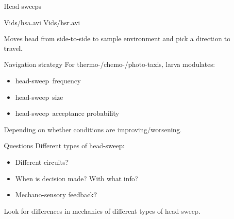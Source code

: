 \documentclass{beamer}%
\newcommand{\hs}{head-sweep}
\newcommand{\Hs}{Head-sweep}
\begin{document}
\begin{frame}{\Hs s}
%
 \begin{center}
 {Vids/hsa.avi}
 {Vids/hsr.avi}
 \end{center}
 Moves head from side-to-side to sample environment and pick a direction to travel.
%
\end{frame}


\begin{frame}{Navigation strategy}
%
 For thermo-/chemo-/photo-taxis, larva modulates:
 \begin{itemize}
   \item \hs\ frequency 
   \item \hs\ size  
   \item \hs\ acceptance probability 
 \end{itemize}
 Depending on whether conditions are improving/worsening.

%
\end{frame}


\begin{frame}{Questions}
%
 Different types of \hs:
 \begin{itemize}
    \item Different circuits?
    \item When is decision made? With what info?
    \item Mechano-sensory feedback?
  \end{itemize}

  \vp Look for differences in mechanics of different types of \hs.
%
\end{frame}
\end{document}
